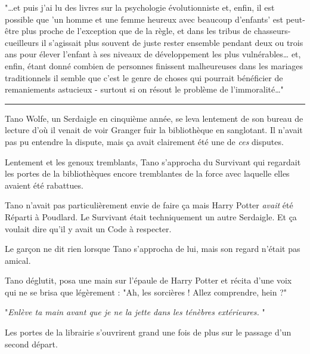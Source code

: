 "…et puis j'ai lu des livres sur la psychologie évolutionniste et, enfin, il est possible que 'un homme et une femme heureux avec beaucoup d'enfants' est peut-être plus proche de l'exception que de la règle, et dans les tribus de chasseurs-cueilleurs il s'agissait plus souvent de juste rester ensemble pendant deux ou trois ans pour élever l'enfant à ses niveaux de développement les plus vulnérables… et, enfin, étant donné combien de personnes finissent malheureuses dans les mariages traditionnels il semble que c'est le genre de choses qui pourrait bénéficier de remaniements astucieux - surtout si on résout le problème de l'immoralité…"
\par\noindent\rule{\textwidth}{0.4pt}
Tano Wolfe, un Serdaigle en cinquième année, se leva lentement de son bureau de lecture d'où il venait de voir Granger fuir la bibliothèque en sanglotant. Il n'avait pas pu entendre la dispute, mais ça avait clairement été une de \emph{ces}  disputes.

Lentement et les genoux tremblants, Tano s'approcha du Survivant qui regardait les portes de la bibliothèques encore tremblantes de la force avec laquelle elles avaient été rabattues.

Tano n'avait pas particulièrement envie de faire ça mais Harry Potter \emph{avait}  été Réparti à Poudlard. Le Survivant était techniquement un autre Serdaigle. Et ça voulait dire qu'il y avait un Code à respecter.

Le garçon ne dit rien lorsque Tano s'approcha de lui, mais son regard n'était pas amical.

Tano déglutit, posa une main sur l'épaule de Harry Potter et récita d'une voix qui ne se brisa que légèrement : "Ah, les sorcières ! Allez comprendre, hein ?"

"\emph{Enlève ta main avant que je ne la jette dans les ténèbres extérieures.} "

Les portes de la librairie s'ouvrirent grand une fois de plus sur le passage d'un second départ.

